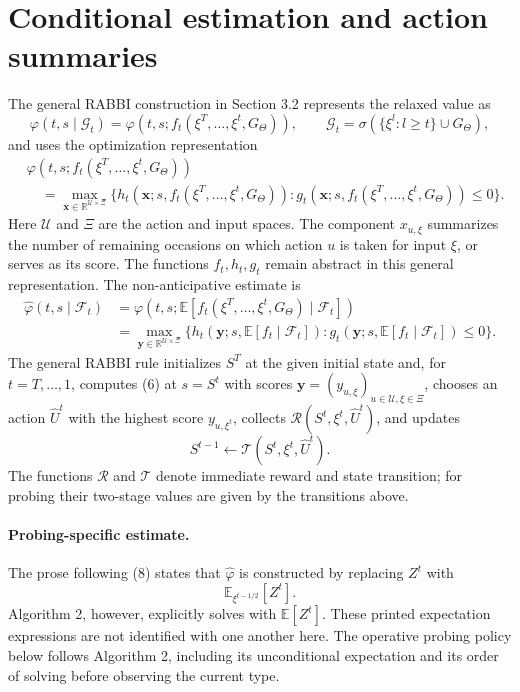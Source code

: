 \documentclass{article}
\begin{document}
\section*{Conditional estimation and action summaries}
The general RABBI construction in Section 3.2 represents the relaxed value as
\[
\varphi(t,s\mid\mathcal G_t)
=\varphi(t,s;f_t(\xi^T,\ldots,\xi^t,G_\Theta)),
\qquad
\mathcal G_t=\sigma(\{\xi^l:l\ge t\}\cup G_\Theta),
\]
and uses the optimization representation
\begin{equation}
\begin{aligned}
&\varphi(t,s;f_t(\xi^T,\ldots,\xi^t,G_\Theta))\\
&\quad=\max_{\mathbf x\in\mathbb R^{\mathcal U\times\Xi}}
\bigl\{h_t(\mathbf x;s,f_t(\xi^T,\ldots,\xi^t,G_\Theta)):
 g_t(\mathbf x;s,f_t(\xi^T,\ldots,\xi^t,G_\Theta))\le0\bigr\}.
\end{aligned}\tag{5}
\end{equation}
Here $\mathcal U$ and $\Xi$ are the action and input spaces. The component $x_{u,\xi}$ summarizes the number of remaining occasions on which action $u$ is taken for input $\xi$, or serves as its score. The functions $f_t,h_t,g_t$ remain abstract in this general representation. The non-anticipative estimate is
\begin{equation}
\begin{aligned}
\hat\varphi(t,s\mid\mathcal F_t)
&=\varphi(t,s;\mathbb E[f_t(\xi^T,\ldots,\xi^t,G_\Theta)\mid\mathcal F_t])\\
&=\max_{\mathbf y\in\mathbb R^{\mathcal U\times\Xi}}
\{h_t(\mathbf y;s,\mathbb E[f_t\mid\mathcal F_t]):
 g_t(\mathbf y;s,\mathbb E[f_t\mid\mathcal F_t])\le0\}.
\end{aligned}\tag{6}
\end{equation}
The general RABBI rule initializes $S^T$ at the given initial state and, for $t=T,\ldots,1$, computes (6) at $s=S^t$ with scores $\mathbf y=(y_{u,\xi})_{u\in\mathcal U,\xi\in\Xi}$, chooses an action $\hat U^t$ with the highest score $y_{u,\xi^t}$, collects $\mathcal R(S^t,\xi^t,\hat U^t)$, and updates
\[
S^{t-1}\leftarrow\mathcal T(S^t,\xi^t,\hat U^t).
\]
The functions $\mathcal R$ and $\mathcal T$ denote immediate reward and state transition; for probing their two-stage values are given by the transitions above.

\paragraph{Probing-specific estimate.}
The prose following (8) states that $\hat\varphi$ is constructed by replacing $Z^t$ with
\[
\mathbb E_{\xi^{t-1/2}}[Z^t].
\]
Algorithm 2, however, explicitly solves with $\mathbb E[Z^t]$. These printed expectation expressions are not identified with one another here. The operative probing policy below follows Algorithm 2, including its unconditional expectation and its order of solving before observing the current type.
\end{document}
